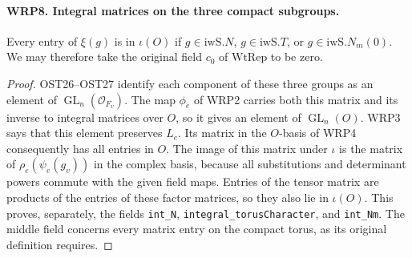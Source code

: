 \documentclass[11pt,a4paper]{article}
\numberwithin{equation}{section}
\theoremstyle{remark}\newtheorem{remark}[theorem]{Remark}
\begin{document}
\paragraph{WRP8. Integral matrices on the three compact subgroups.}
\label{claim:WRP8}
Every entry of $\xi(g)$ is in $\iota(O)$ if
$g\in\mathrm{iwS}.N$, $g\in\mathrm{iwS}.T$, or
$g\in\mathrm{iwS}.N_m(0)$.  We may therefore take the
original field $c_0$ of $\mathrm{WtRep}$ to be zero.
\begin{proof}
OST26--OST27 identify each component of these three groups
as an element of $\operatorname{GL}_n(\mathcal O_{F_v})$.
The map $\phi_e$ of WRP2 carries both this matrix and its
inverse to integral matrices over $O$, so it gives an
element of $\operatorname{GL}_n(O)$.  WRP3 says that this
element preserves $L_e$.  Its matrix in the $O$-basis
of WRP4 consequently has all entries in $O$.  The image
of this matrix under $\iota$ is the matrix of
$\rho_e(\psi_e(g_v))$ in the complex basis, because all
substitutions and determinant powers commute with the
given field maps.  Entries of the tensor matrix are
products of the entries of these factor matrices, so
they also lie in $\iota(O)$.  This proves, separately,
the fields \texttt{int\_\allowbreak N},
\texttt{integral\_\allowbreak torus\allowbreak Character}, and \texttt{int\_\allowbreak Nm}.
The middle field concerns every matrix entry on the compact
torus, as its original definition requires.
\end{proof}

\end{document}
